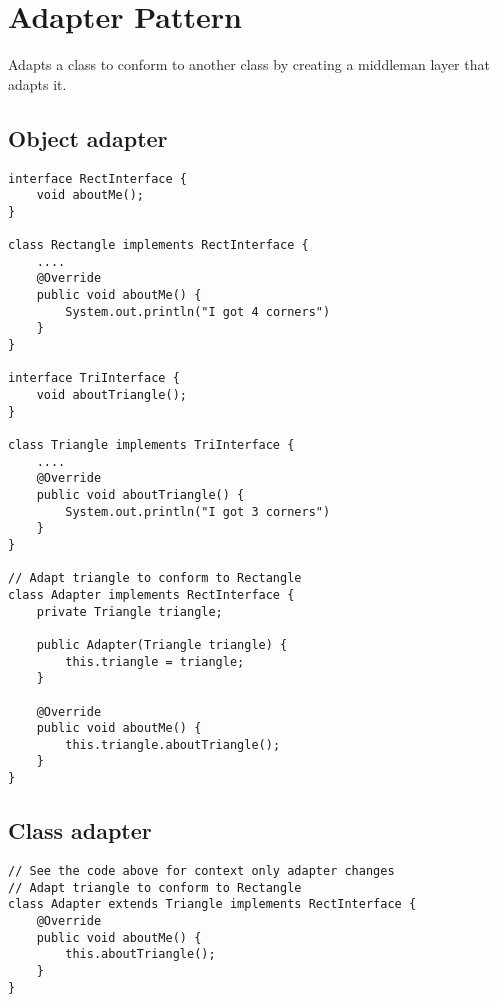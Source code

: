 \section{Adapter Pattern}
Adapts a class to conform to another class by creating a middleman layer that adapts it.
\subsection{Object adapter}
\begin{lstlisting}
interface RectInterface {
    void aboutMe();
}

class Rectangle implements RectInterface {
    ....
    @Override
    public void aboutMe() {
        System.out.println("I got 4 corners")
    }
}

interface TriInterface {
    void aboutTriangle();
}

class Triangle implements TriInterface {
    ....
    @Override
    public void aboutTriangle() {
        System.out.println("I got 3 corners")
    }
}

// Adapt triangle to conform to Rectangle
class Adapter implements RectInterface {
    private Triangle triangle;

    public Adapter(Triangle triangle) {
        this.triangle = triangle;
    }

    @Override
    public void aboutMe() {
        this.triangle.aboutTriangle();
    }
}
\end{lstlisting}

\subsection{Class adapter}
\begin{lstlisting}
// See the code above for context only adapter changes
// Adapt triangle to conform to Rectangle
class Adapter extends Triangle implements RectInterface {
    @Override
    public void aboutMe() {
        this.aboutTriangle();
    }
}
\end{lstlisting}